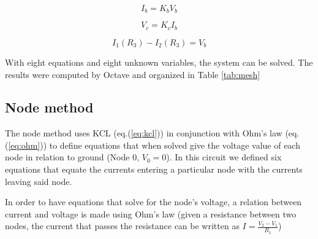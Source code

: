 \begin{equation}
	I_b = K_bV_b
	\label{eq:depsrc1}
\end{equation}

\begin{equation}
	V_c = K_cI_b
	\label{eq:depsrc2}
\end{equation}

\begin{equation}
	I_1(R_3)-I_2(R_3) = V_b
	\label{eq:rel_ohm1}
\end{equation}

With eight equations and eight unknown variables, the system can be solved.
The results were computed by Octave and organized in Table \ref{tab:mesh}

%   		
% 




\subsection{Node method}
\label{subsec:node_met}

The node method uses KCL (eq.(\ref{eq:kcl})) in conjunction with Ohm’s law (eq.(\ref{eq:ohm})) to define
equations that when solved give the voltage value of each node in relation to ground (Node 0, $V_0 = 0$).
In this circuit we defined six equations that equate the currents entering a particular node with the
currents leaving said node. 

In order to have equations that solve for the node’s voltage, a relation between current and voltage is made using 
Ohm’s law (given a resistance between two nodes, the current that passes the resistance can be written as 
$I=\frac{V_2-V_1}{R_1}$)

